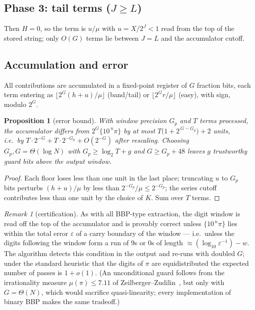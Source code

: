 \documentclass[11pt]{article}
\newtheorem{proposition}[theorem]{Proposition}
\theoremstyle{remark}
\newtheorem{remark}[theorem]{Remark}
\theoremstyle{definition}
\newcommand{\frc}[1]{\{#1\}}
\newcommand{\fl}[1]{\lfloor #1\rfloor}
\begin{document}
\subsection{Phase 3: tail terms ($J\ge L$)}

Then $H=0$, so the term is $u/\mu$ with
$u=X/2^{J}<1$ read from the top of the stored string; only
$O(G)$ terms lie between $J=L$ and the accumulator cutoff.

\subsection{Accumulation and error}\label{sec:error}

All contributions are accumulated in a fixed-point register of $G$ fraction
bits, each term entering as
$\fl{2^{G}(h+u)/\mu}$ (band/tail) or $\fl{2^{G}r/\mu}$ (easy), with sign,
modulo $2^{G}$.

\begin{proposition}[error bound]\label{prop:error}
With window precision $G_p$ and $T$ terms processed, the accumulator differs
from $2^{G}\frc{10^{\,n}\pi}$ by at most
$T\bigl(1+2^{\,G-G_p}\bigr)+2$ units, i.e.\ by
$T\cdot 2^{-G}+T\cdot 2^{-G_p}+O(2^{-G})$ after rescaling. Choosing
$G_p,G=\Theta(\log N)$ with $G_p\ge \log_2 T+g$ and $G\ge G_p+48$ leaves
$g$ trustworthy guard bits above the output window.
\end{proposition}

\begin{proof}
Each floor loses less than one unit in the last place; truncating $u$ to
$G_p$ bits perturbs $(h+u)/\mu$ by less than $2^{-G_p}/\mu\le 2^{-G_p}$; the
series cutoff contributes less than one unit by the choice of $K$. Sum over
$T$ terms.
\end{proof}

\begin{remark}[certification]\label{rem:guard}
As with all BBP-type extraction, the digit window is read off the top of the
accumulator and is provably correct unless $\frc{10^{\,n}\pi}$ lies within
the total error $\varepsilon$ of a carry boundary of the window --- i.e.\
unless the digits following the window form a run of $9$s or $0$s of length
$\approx(\log_{10}\varepsilon^{-1})-w$. The algorithm detects this condition
in the output and re-runs with doubled $G$; under the standard heuristic that
the digits of $\pi$ are equidistributed the expected number of passes is
$1+o(1)$. (An unconditional guard follows from the irrationality measure
$\mu(\pi)\le 7.11$ of Zeilberger--Zudilin~\cite{ZZ15}, but only with
$G=\Theta(N)$, which would sacrifice quasi-linearity; every implementation
of binary BBP makes the same tradeoff.)
\end{remark}
\end{document}
